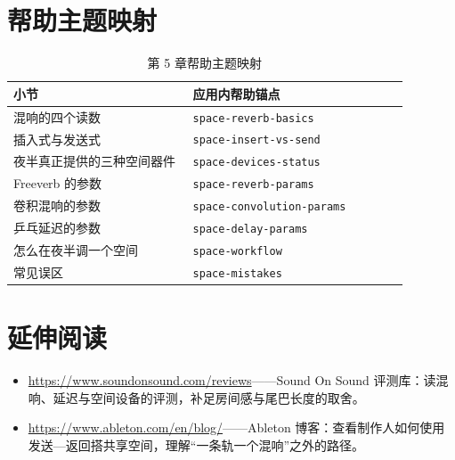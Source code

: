 \section{帮助主题映射}

\begin{table}[htbp]
\centering
\small
\begin{tabular}{@{}p{0.40\linewidth}p{0.48\linewidth}@{}}
\hline
小节 & 应用内帮助锚点 \\
\hline
混响的四个读数 & \texttt{space-reverb-basics} \\
插入式与发送式 & \texttt{space-insert-vs-send} \\
夜半真正提供的三种空间器件 & \texttt{space-devices-status} \\
Freeverb 的参数 & \texttt{space-reverb-params} \\
卷积混响的参数 & \texttt{space-convolution-params} \\
乒乓延迟的参数 & \texttt{space-delay-params} \\
怎么在夜半调一个空间 & \texttt{space-workflow} \\
常见误区 & \texttt{space-mistakes} \\
\hline
\end{tabular}
\caption{第 5 章帮助主题映射}
\end{table}

\section*{延伸阅读}
\begin{itemize}[leftmargin=1.5em]
\item \url{https://www.soundonsound.com/reviews}——Sound On Sound 评测库：读混响、延迟与空间设备的评测，补足房间感与尾巴长度的取舍。
\item \url{https://www.ableton.com/en/blog/}——Ableton 博客：查看制作人如何使用发送—返回搭共享空间，理解“一条轨一个混响”之外的路径。
\end{itemize}
